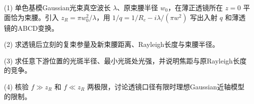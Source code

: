 (1) 单色基模Gaussian光束真空波长 \(\lambda\)、原束腰半径 \(w_0\)，在薄正透镜所在 \(z=0\) 平面恰为束腰。引入 \(z_R=\pi w_0^2/\lambda\)，用 \(1/q=1/R_c-i\lambda/(\pi w^2)\) 写出入射 \(q\) 和薄透镜的ABCD变换。

(2) 求透镜后立刻的复束参量及新束腰距离、Rayleigh长度与束腰半径。

(3) 求任意下游位置的光斑半径、最小光斑处光强，并说明焦距与原Rayleigh长度的竞争。

(4) 核验 \(f\gg z_R\) 和 \(f\ll z_R\) 两极限，讨论透镜口径有限时理想Gaussian近轴模型的限制。

